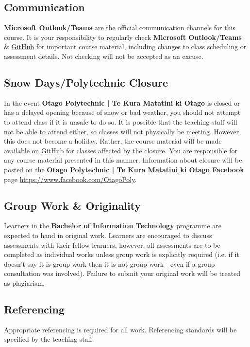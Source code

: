 \documentclass{article}
\begin{document}
\subsection*{Communication}
\textbf{Microsoft Outlook/Teams} are the official communication channels for this course. It is your responsibility to regularly check \textbf{Microsoft Outlook/Teams} \& \href{https://github.com/otago-polytechnic-bit-courses/ID607001-intro-app-dev-concepts}{GitHub} for important course material, including changes to class scheduling or assessment details. Not checking will not be accepted as an excuse.

\subsection*{Snow Days/Polytechnic Closure}
In the event \textbf{Otago Polytechnic | Te Kura Matatini ki Otago} is closed or has a delayed opening because of snow or bad weather, you should not attempt to attend class if it is unsafe to do so. It is possible that the teaching staff will not be able to attend either, so classes will not physically be meeting. However, this does not become a holiday. Rather, the course material will be made available on \href{https://github.com/otago-polytechnic-bit-courses/ID607001-intro-app-dev-concepts}{GitHub} for classes affected by the closure. You are responsible for any course material presented in this manner. Information about closure will be posted on the \textbf{Otago Polytechnic | Te Kura Matatini ki Otago Facebook} page \href{https://www.facebook.com/OtagoPoly}{https://www.facebook.com/OtagoPoly}.

\subsection*{Group Work \& Originality}
Learners in the \textbf{Bachelor of Information Technology} programme are expected to hand in original work. Learners are encouraged to discuss assessments with their fellow learners, however, all assessments are to be completed as individual works unless group work is explicitly required (i.e. if it doesn't say it is group work then it is not group work - even if a group consultation was involved). Failure to submit your original work will be treated as plagiarism.

\subsection*{Referencing}
Appropriate referencing is required for all work. Referencing standards will be specified by the teaching staff.
\end{document}
